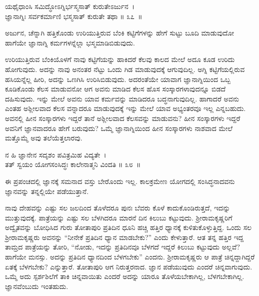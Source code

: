 \vskip 2pt

\begin{shloka}
ಯಥೈಧಾಂಸಿ ಸಮಿದ್ಧೋಽಗ್ನಿರ್ಭಸ್ಮಸಾತ್ ಕುರುತೇಽರ್ಜುನ~।\\ಜ್ಞಾನಾಗ್ನಿಃ ಸರ್ವಕರ್ಮಾಣಿ ಭಸ್ಮಸಾತ್ ಕುರುತೇ ತಥಾ \hfill॥ ೩೭~॥
\end{shloka}

\vskip 2pt

\begin{artha}
ಅರ್ಜುನ, ಚೆನ್ನಾಗಿ ಹತ್ತಿಕೊಂಡು ಉರಿಯುತ್ತಿರುವ ಬೆಂಕಿ ಕಟ್ಟಿಗೆಗಳನ್ನು ಹೇಗೆ ಸುಟ್ಟು ಬೂದಿ ಮಾಡುವುದೋ ಹಾಗೆಯೇ ಜ್ಞಾನಾಗ್ನಿ ಕರ್ಮಗಳನ್ನೆಲ್ಲಾ ಭಸ್ಮಮಾಡಿಬಿಡುವುದು.
\end{artha}

\newpage

ಉರಿಯುತ್ತಿರುವ ಬೆಂಕಿಯೊಳಗೆ ನಾವು ಕಟ್ಟಿಗೆಯನ್ನು ಹಾಕಿದರೆ ಕೆಲವು ಕಾಲದ ಮೇಲೆ ಅದೂ ಕೂಡ ಉರಿದು ಹೋಗುವುದು. ಅದನ್ನು ನಾವು ಅನಂತರ ನೆಟ್ಟು ಒಂದು ಗಿಡ ಮಾಡುವುದಕ್ಕೆ ಆಗುವುದಿಲ್ಲ. ಅಗ್ನಿ ಕಟ್ಟಿಗೆಯಲ್ಲಿರುವ ಹಸಿಯನ್ನೆಲ್ಲ ಹೀರಿ, ಅದನ್ನು ಒಣಗಿಸಿ ಉರಿಸಿಬಿಡುವುದು. ಅದರಂತೆಯೇ ಯಾವಾಗ ಜ್ಞಾನಾಗ್ನಿಯಿಂದ ಒಬ್ಬ ಕೂಡಿಕೊಂಡು ಕೆಲಸ ಮಾಡುವನೋ ಆಗ ಅವನು ಮಾಡಿದ ಕೆಲಸ ಹೊಸ ಸಂಸ್ಕಾರಗಳಾವುದನ್ನೂ ಬಿಡದೆ ದಹಿಸುವುದು. ಇನ್ನು ಮೇಲೆ ಅವನು ಯಾವ ಕರ್ಮವನ್ನು ಮಾಡಿದರೂ ಬದ್ಧನಾಗುವುದಿಲ್ಲ. ಹಾಗಾದರೆ ಅವನು ಎಂತಹ ಅಶ್ಲೀಲವಾದ ಕೆಲಸ ವನ್ನಾದರೂ ಮಾಡುವುದಕ್ಕೆ ಇನ್ನು ಮೇಲೆ ಯಾವ ಅಭ್ಯಂತರವೂ ಇಲ್ಲ ಎನ್ನಬಹುದು. ಅವನಲ್ಲಿ ಹೀನ ಸಂಸ್ಕಾರಗಳು ಇದ್ದರೆ ತಾನೆ ಅಶ್ಲೀಲವಾದ ಕೆಲಸವನ್ನು ಮಾಡುವನು? ಹೀನ ಸಂಸ್ಕಾರಗಳು ಇದ್ದರೆ ಅವನಿಗೆ ಜ್ಞಾನವಾದರೂ ಹೇಗೆ ಬರುವುದು? ಒಮ್ಮೆ ಜ್ಞಾನಾಗ್ನಿಯಿಂದ ಹೀನ ಸಂಸ್ಕಾರಗಳು ನಾಶವಾದ ಮೇಲೆ ಮತ್ತೊಮ್ಮೆ ಅವು ತಲೆಯೆತ್ತಲಾರವು.

\begin{shloka}
ನ ಹಿ ಜ್ಞಾನೇನ ಸದೃಶಂ ಪವಿತ್ರಮಿಹ ವಿದ್ಯತೇ~।\\ತತ್ ಸ್ವಯಂ ಯೋಗಸಂಸಿದ್ಧಃ ಕಾಲೇನಾತ್ಮನಿ ವಿಂದತಿ \hfill॥ ೩೮~॥
\end{shloka}

\begin{artha}
ಈ ಪ್ರಪಂಚದಲ್ಲಿ ಜ್ಞಾನಕ್ಕೆ ಸಮನಾದ ವಸ್ತು ಬೇರೊಂದು ಇಲ್ಲ. ಕಾಲಕ್ರಮೇಣ ಯೋಗದಲ್ಲಿ ಸಂಸಿದ್ಧನಾದವನು ಜ್ಞಾನವನ್ನು ತನ್ನಲ್ಲಿಯೇ ಪಡೆಯುತ್ತಾನೆ.
\end{artha}

ನಾವು ದೇಹವನ್ನು ಎಷ್ಟು ಸಲ ಜಲದಿಂದ ತೊಳೆದರೂ ಪುನಃ ಬೆವರು ಕೊಳೆ ಕಾದುಕೊಂಡಿರುತ್ತದೆ, ಇದನ್ನು ಮುತ್ತುವುದಕ್ಕೆ. ಪಾತ್ರೆಯನ್ನು ಎಷ್ಟು ಸಲ ಬೆಳಗಿದರೂ ಮಾರನೆ ದಿನ ಕಿಲುಬು ಕಟ್ಟುವುದು. ಶ‍್ರೀರಾಮಕೃಷ್ಣರಿಗೆ ಅದ್ವೈತವನ್ನು ಬೋಧಿಸಿದ ಗುರು ತೋತಾಪುರಿ ಪ್ರತಿದಿನ ಧೂನಿ ಹಚ್ಚಿ ಹತ್ತಿರ ಧ್ಯಾನಕ್ಕೆ ಕುಳಿತುಕೊಳ್ಳುತ್ತಿದ್ದ. ಒಂದು ಸಲ ಶ‍್ರೀರಾಮಕೃಷ್ಣರು ಅವನನ್ನು “ನೀನೇಕೆ ಪ್ರತಿದಿನ ಧ್ಯಾನ ಮಾಡಬೇಕು?” ಎಂದು ಕೇಳುತ್ತಾರೆ. ಆತ ತನ್ನ ಹತ್ತಿರ ಇದ್ದ ತಾಮ್ರದ ಪಾತ್ರೆಯನ್ನು ತೋರಿ, “ನೋಡು, ಇದನ್ನು ಪ್ರತಿದಿನವೂ ಬೆಳಗದೆ ಇದ್ದರೆ ಕಿಲುಬು ಕಟ್ಟುವುದು ಅಲ್ಲವೆ? ಹಾಗೆಯೇ ಮನಸ್ಸು. ಅದನ್ನು ಪ್ರತಿದಿನ ಧ್ಯಾನದಿಂದ ಬೆಳಗಬೇಕು” ಎಂದನು. ಶ‍್ರೀರಾಮಕೃಷ್ಣರು ಆ ಪಾತ್ರೆ ಚಿನ್ನದ್ದಾಗಿದ್ದರೆ ಏತಕ್ಕೆ ಬೆಳಗಬೇಕು? ಎನ್ನುತ್ತಾರೆ. ತೋತಾಪುರಿ ಆಗ ನಿರುತ್ತರನಾದ. ಜ್ಞಾನ ಪಡೆಯುವುದು ಎಂದರೆ ಚಿನ್ನವಾಗುವುದು. ಒಮ್ಮೆ ಅದು ಸ್ಪರ್ಶಶಿಲೆಗೆ ತಾಕಿ ಚಿನ್ನವಾಯಿತು ಎಂದರೆ ಅದನ್ನು ಯಾರೂ ತೊಳೆಯಬೇಕಾಗಿಲ್ಲ, ಬೆಳಗಬೇಕಾಗಿಲ್ಲ. ಜ್ಞಾನವೆಂಬುದು ಇಂತಹುದು.

